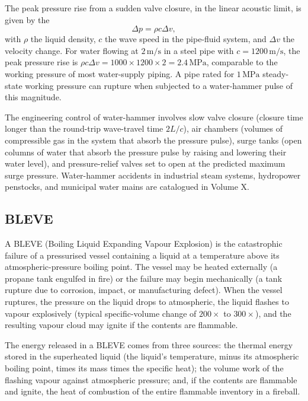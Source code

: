 The peak pressure rise from a sudden valve closure, in the linear
acoustic limit, is given by the 
\[
\Delta p = \rho c \Delta v,
\]
with $\rho$ the liquid density, $c$ the wave speed in the pipe-fluid
system, and $\Delta v$ the velocity change. For water flowing at
$2\,\text{m}/\text{s}$ in a steel pipe with $c = 1200\,\text{m}/
\text{s}$, the peak pressure rise is $\rho c \Delta v = 1000 \times
1200 \times 2 = 2.4\,\text{MPa}$, comparable to the working pressure
of most water-supply piping. A pipe rated for $1\,\text{MPa}$ steady-
state working pressure can rupture when subjected to a
water-hammer pulse of this magnitude.

The engineering control of water-hammer involves slow valve closure
(closure time longer than the round-trip wave-travel time $2L/c$),
air chambers (volumes of compressible gas in the system that absorb
the pressure pulse), surge tanks (open columns of water that absorb
the pressure pulse by raising and lowering their water level), and
pressure-relief valves set to open at the predicted maximum surge
pressure. Water-hammer accidents in industrial steam systems,
hydropower penstocks, and municipal water mains are catalogued in
Volume X.

\subsection{BLEVE}

A BLEVE (Boiling Liquid Expanding Vapour Explosion) is the catastrophic
failure of a pressurised vessel containing a liquid at a temperature
above its atmospheric-pressure boiling point. The vessel may be heated
externally (a propane tank engulfed in fire) or the failure may begin
mechanically (a tank rupture due to corrosion, impact, or
manufacturing defect). When the vessel ruptures, the pressure on the
liquid drops to atmospheric, the liquid flashes to vapour explosively
(typical specific-volume change of $200\times$ to $300\times$), and
the resulting vapour cloud may ignite if the contents are flammable.

The energy released in a BLEVE comes from three sources: the
thermal energy stored in the superheated liquid (the liquid's
temperature, minus its atmospheric boiling point, times its mass times
the specific heat); the volume work of the flashing vapour against
atmospheric pressure; and, if the contents are flammable and ignite,
the heat of combustion of the entire flammable inventory in a fireball.


